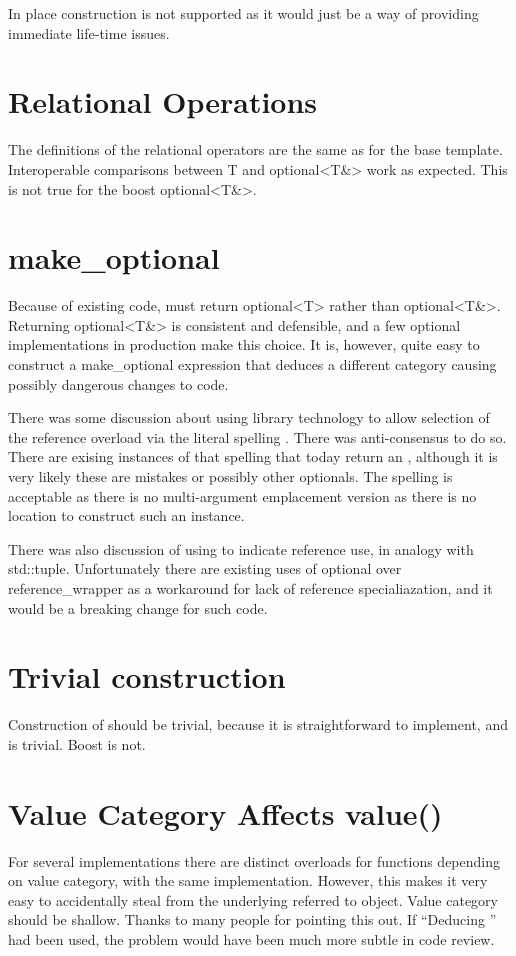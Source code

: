 \documentclass[a4paper,10pt,oneside,openany,final,article]{memoir}
\begin{document}
In place construction is not supported as it would just be a way of providing immediate life-time issues.

\section{Relational Operations}

The definitions of the relational operators are the same as for the base template. Interoperable comparisons between T and optional<T\&> work as expected. This is not true for the boost optional<T\&>.

\section{make_optional}
Because of existing code,  must return optional<T> rather than optional<T\&>. Returning optional<T\&> is consistent and defensible, and a few optional implementations in production make this choice. It is, however, quite easy to construct a make_optional expression that deduces a different category causing possibly dangerous changes to code.

There was some discussion about using library technology to allow selection of the reference overload via the literal spelling . There was anti-consensus to do so. There are exising instances of that spelling that today return an , although it is very likely these are mistakes or possibly other optionals. The spelling  is acceptable as there is no multi-argument emplacement version as there is no location to construct such an instance.

There was also discussion of using  to indicate reference use, in analogy with std::tuple. Unfortunately there are existing uses of optional over reference_wrapper as a workaround for lack of reference specialiazation, and it would be a breaking change for such code.

\section{Trivial construction}
Construction of  should be trivial, because it is straightforward to implement, and  is trivial. Boost is not.

\section{Value Category Affects value()}
For several implementations there are distinct overloads for functions depending on value category, with the same implementation. However, this makes it very easy to accidentally steal from the underlying referred to object. Value category should be shallow. Thanks to many people for pointing this out. If ``Deducing '' had been used, the problem would have been much more subtle in code review.
\end{document}
